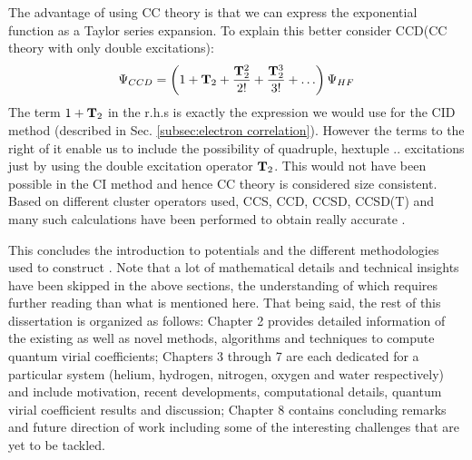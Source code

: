                 The advantage of using CC theory is that we can express the exponential function as a Taylor series expansion. To explain this better consider CCD(CC theory with only double excitations):
                \begin{equation}\label{eq:ccd}
                    \Psi_{CCD} = \left( 1 + {\mathbf {T}}_2 + \frac{{\mathbf {T}}_2^2}{2!} + \frac{{\mathbf {T}}_2^3}{3!} + \ldots \right) \Psi_{HF}
                \end{equation}
                The term $1 + {\mathbf {T}}_2$ in the r.h.s is exactly the expression we would use for the CID method (described in Sec. \ref{subsec:electron correlation}). However the terms to the right of it enable us to include the possibility of quadruple, hextuple .. excitations just by using the double excitation operator ${\mathbf {T}}_2$. This would not have been possible in the CI method and hence CC theory is considered size consistent. Based on different cluster operators used, CCS, CCD, CCSD, CCSD(T) and many such calculations have been performed to obtain really accurate \PESs.

                This concludes the introduction to \abinitio{} potentials and the different methodologies used to construct \PESs. Note that a lot of mathematical details and technical insights have been skipped in the above sections, the understanding of which requires further reading than what is mentioned here. That being said, the rest of this dissertation is organized as follows: Chapter 2 provides detailed information of the existing as well as novel methods, algorithms and techniques to compute quantum virial coefficients; Chapters 3 through 7 are each dedicated for a particular system (helium, hydrogen, nitrogen, oxygen and water respectively) and include motivation, recent developments, computational details, quantum virial coefficient results and discussion; Chapter 8 contains concluding remarks and future direction of work including some of the interesting challenges that are yet to be tackled.
